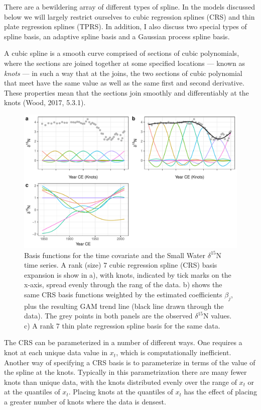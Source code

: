 \documentclass[12pt,]{article}
\begin{document}
There are a bewildering array of different types of spline. In the
models discussed below we will largely restrict ourselves to cubic
regression splines (CRS) and thin plate regression splines (TPRS). In
addition, I also discuss two special types of spline basis, an adaptive
spline basis and a Gaussian process spline basis.

A cubic spline is a smooth curve comprised of sections of cubic
polynomials, where the sections are joined together at some specified
locations --- known as \emph{knots} --- in such a way that at the joins,
the two sections of cubic polynomial that meet have the same value as
well as the same first and second derivative. These properties mean that
the sections join smoothly and differentiably at the knots (Wood, 2017,
5.3.1).

\begin{figure}

{\centering \includegraphics[width=0.8\linewidth]{manuscript_files/figure-latex/basis-function-example-plot-1} 

}

\caption{Basis functions for the time covariate and the Small Water $\delta^{15}\text{N}$ time series. A rank (size) 7 cubic regression spline (CRS) basis expansion is show in a), with knots, indicated by tick marks on the x-axis, spread evenly through the rang of the data. b) shows the same CRS basis functions weighted by the estimated coefficients $\beta_j$, plus the resulting GAM trend line (black line drawn through the data). The grey points in both panels are the observed $\delta^{15}\text{N}$ values. c) A rank 7 thin plate regression spline basis for the same data.}\label{fig:basis-function-example-plot}
\end{figure}

The CRS can be parameterized in a number of different ways. One requires
a knot at each unique data value in \(x_t\), which is computationally
inefficient. Another way of specifying a CRS basis is to parameterize in
terms of the value of the spline at the knots. Typically in this
parametrization there are many fewer knots than unique data, with the
knots distributed evenly over the range of \(x_t\) or at the quantiles
of \(x_t\). Placing knots at the quantiles of \(x_t\) has the effect of
placing a greater number of knots where the data is densest.
\end{document}
